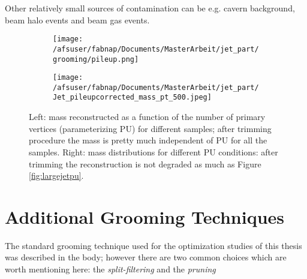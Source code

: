 Other relatively small sources of contamination can be e.g. cavern background, beam halo events and beam gas events.


\begin{figure}
    \centering
    \begin{subfigure}[b]{0.45\textwidth}
	\centering
        \texttt{[image: /afsuser/fabnap/Documents/MasterArbeit/jet\_part/grooming/pileup.png]}
 
    \end{subfigure}
    \begin{subfigure}[b]{0.45\textwidth}
	\centering
        \texttt{[image: /afsuser/fabnap/Documents/MasterArbeit/jet\_part/Jet\_pileupcorrected\_mass\_pt\_500.jpeg]}
   
    \end{subfigure}
    \caption[Effect of pile-up before and after trimming]{Left: mass reconstructed as a function of the number of primary vertices (parameterizing PU) for different samples; after trimming procedure the mass is pretty much independent of PU for all the samples. Right: mass distributions for different PU conditions: after trimming the reconstruction is not degraded as much as Figure \ref{fig:largejetpu}.} 
    \label{fig:trimmingperformance}
\end{figure}

\chapter{Additional Grooming Techniques}
The standard grooming technique used for the optimization studies of this thesis was described in the body; however there are two common choices which are worth mentioning here: the \textit{split-filtering} and the \textit{pruning}

